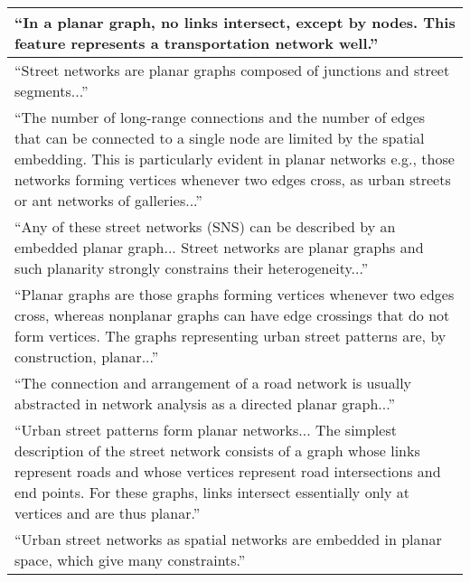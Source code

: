 \begin{tabular}{ | p{\textwidth} | }

\hline

\enquote{In a planar graph, no links intersect, except by nodes. This feature represents a transportation network well.} \citep[p.~6]{dill_measuring_2004} \\ \hline

\enquote{Street networks are planar graphs composed of junctions and street segments...} \citep[p.~18]{batty_network_2005} \\ \hline

\enquote{The number of long-range connections and the number of edges that can be connected to a single node are limited by the spatial embedding. This is particularly evident in planar networks e.g., those networks forming vertices whenever two edges cross, as urban streets or ant networks of galleries...} \citep[p.~1]{crucitti_centrality_2006} \\ \hline

\enquote{Any of these street networks (SNS) can be described by an embedded planar graph... Street networks are planar graphs and such planarity strongly constrains their heterogeneity...} \citep[pp.~514~\&~521]{buhl_topological_2006} \\ \hline

\enquote{Planar graphs are those graphs forming vertices whenever two edges cross, whereas nonplanar graphs can have edge crossings that do not form vertices. The graphs representing urban street patterns are, by construction, planar...} \citep[p.~3]{cardillo_structural_2006} \\ \hline

\enquote{The connection and arrangement of a road network is usually abstracted in network analysis as a directed planar graph...} \citep[p.~340]{xie_measuring_2007} \\ \hline

\enquote{Urban street patterns form planar networks... The simplest description of the street network consists of a graph whose links represent roads and whose vertices represent road intersections and end points. For these graphs, links intersect essentially only at vertices and are thus planar.} \citep[p.~1]{barthelemy_modeling_2008} \\ \hline

\enquote{Urban street networks as spatial networks are embedded in planar space, which give many constraints.} \citep[p.~1]{hu_topological_2008} \\ \hline


\end{tabular}
